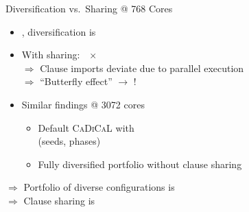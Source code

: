\documentclass[t,english]{sdqbeamer}
\begin{document}
\begin{frame}{Diversification vs.\ Sharing @ 768 Cores~\cite{schreiber2024mallobsat}}
\begin{minipage}{0.43\textwidth}
		\vspace*{-1mm}
		\centering
	\end{minipage}\quad%
	\begin{minipage}{0.545\textwidth}
		\begin{itemize}
			\item {}, diversification is 
			\pause
			\item With sharing:\ \ $\times$  \\[1mm]
			\pause
			$\Rightarrow$ Clause imports deviate due to parallel execution\\
			$\Rightarrow$ ``Butterfly effect'' $\rightarrow$ !
			\vspace*{3mm}
			\pause
			\item Similar findings @ 3072 cores
			\begin{itemize}
				\item Default \textsc{CaDiCaL} with \\
				(seeds, phases) 
				\item Fully diversified portfolio without clause sharing 
			\end{itemize}
		\end{itemize}
		
		\pause
		\vspace*{5mm}
		$\Rightarrow$ {Portfolio of diverse configurations is }
		\\$\Rightarrow$ {Clause sharing is }
	\end{minipage}%
\end{frame}
\end{document}
